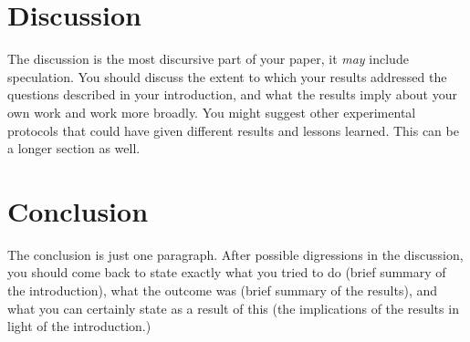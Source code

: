 \documentclass[a4paper,12pt]{article}
\begin{document}
\section{Discussion}

The discussion is the most discursive part of your paper, it {\em may}
include speculation. You should discuss the extent to which your
results addressed the questions described in your introduction, and
what the results imply about your own work and work more broadly.  You
might suggest other experimental protocols that could have given
different results and lessons learned.  This can be a longer section
as well.

\section{Conclusion}
The conclusion is just one paragraph.  After possible digressions in
the discussion, you should come back to state exactly what you tried
to do (brief summary of the introduction), what the outcome was (brief
summary of the results), and what you can certainly state as a
result of this (the implications of the results in light of the introduction.)



\end{document}
